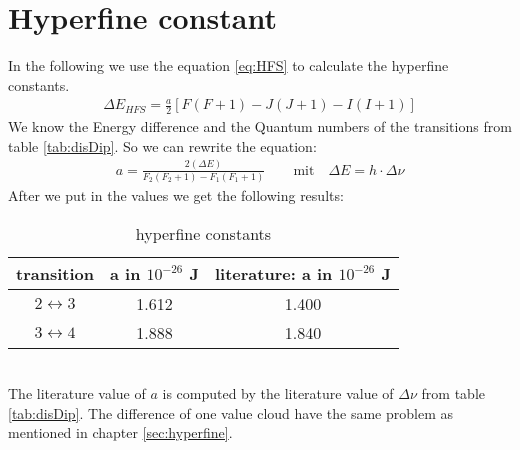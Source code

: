 \section{Hyperfine constant}
In the following we use the equation \ref{eq:HFS} to calculate the hyperfine constants.
\begin{align}
    \label{eq:HFS}
    \Delta E_{HFS} = \frac{a}{2} [F(F+1) - J(J+1) - I(I+1)]
\end{align}
We know the Energy difference and the Quantum numbers of the transitions from table \ref{tab:disDip}. So we can rewrite the equation: 
\begin{align}
    a = \frac{2(\Delta E)}{F_2(F_2+1)-F_1(F_1+1)} \qquad \text{mit} \quad \Delta E = h \cdot \Delta \nu
\end{align}
After we put in the values we get the following results: 
\begin{table}[h]
    \centering
\begin{tabular}{c|c|c}
    transition & a in $10^{-26}$ J & literature: a in $10^{-26}$ J \\
    \hline
    $2\leftrightarrow 3$ & 1.612 & 1.400\\
    $3\leftrightarrow 4$ & 1.888 & 1.840
\end{tabular}
\caption{hyperfine constants}
\end{table} \\
The literature value of $a$ is computed by the literature value of $\Delta \nu$ from table \ref{tab:disDip}. The difference of one value cloud have the same problem as mentioned in chapter \ref{sec:hyperfine}. 